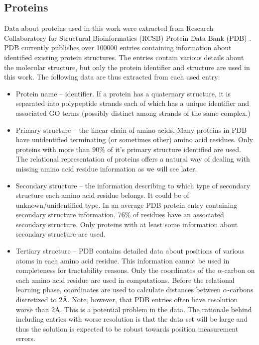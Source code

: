 \documentclass[11pt,twoside,a4paper]{book}
\begin{document}
\subsection{Proteins}
\label{ssec:proteins}
Data about proteins used in this work were extracted from Research Collaboratory for Structural Bioinformatics (RCSB) Protein Data Bank (PDB) \cite{pdb}.
PDB currently publishes over 100000 entries containing information about identified existing protein structures.
The entries contain various details about the molecular structure,
but only the protein identifier and structure are used in this work.
The following data are thus extracted from each used entry:
\begin{itemize}
 \item Protein name -- identifier. If a protein has a quaternary structure,
 it is separated into polypeptide strands each of which has a unique identifier and associated GO terms
 (possibly distinct among strands of the same complex.)
 \item Primary structure -- the linear chain of amino acids.
 Many proteins in PDB have unidentified terminating (or sometimes other) amino acid residues.
 Only proteins with more than 90\% of it's primary structure identified are used.
 The relational representation of proteins offers a natural way of dealing with missing amino
 acid residue information as we will see later.
 \item Secondary structure -- the information describing to which type of secondary structure each amino acid residue belongs.
 It could be of unknown/unidentified type. In an average PDB protein entry containing secondary structure information, 76\% of residues have an associated secondary structure.
 Only proteins with at least some information about secondary structure are used.
 \item Tertiary structure -- PDB contains detailed data about positions of various atoms in each amino acid residue.
 This information cannot be used in completeness for tractability reasons. 
 Only the coordinates of the $\alpha$-carbon on each amino acid residue are used in computations.
 Before the relational learning phase, coordinates are used to calculate distances between $\alpha$-carbons discretized to 2Å.
 Note, however, that PDB entries often have resolution worse than 2Å.
 This is a potential problem in the data.
 The rationale behind including entries with worse resolution is that the data set will be large and thus the solution
 is expected to be robust towards position measurement errors.
\end{itemize}
\end{document}
